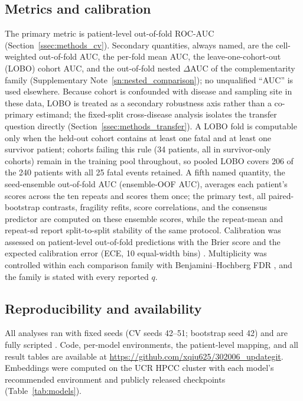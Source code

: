 \documentclass[11pt,a4paper]{article}
\begin{document}
\subsection{Metrics and calibration}
\label{ssec:methods_metrics}

The primary metric is patient-level out-of-fold ROC-AUC
(Section~\ref{ssec:methods_cv}). Secondary quantities, always named, are the
cell-weighted out-of-fold AUC, the per-fold mean AUC, the leave-one-cohort-out
(LOBO) cohort AUC, and the out-of-fold nested $\Delta$AUC of the
complementarity family (Supplementary Note~\ref{sn:nested_comparison}); no
unqualified ``AUC'' is used elsewhere. Because cohort is
confounded with disease and sampling site in these data, LOBO is treated as a
secondary robustness axis rather than a co-primary estimand; the fixed-split
cross-disease analysis isolates the transfer question directly
(Section~\ref{ssec:methods_transfer}). A LOBO fold is computable only when the
held-out cohort contains at least one fatal and at least one survivor patient;
cohorts failing this rule (34 patients, all in survivor-only cohorts) remain
in the training pool throughout, so pooled LOBO covers 206 of the 240 patients
with all 25 fatal events retained. A fifth named quantity, the
seed-ensemble out-of-fold AUC (ensemble-OOF AUC), averages each patient's
scores across the ten repeats and scores them once; the primary test, all
paired-bootstrap contrasts, fragility refits, score correlations, and the
consensus predictor are computed on these ensemble scores, while the
repeat-mean and repeat-sd report split-to-split stability of the same
protocol.
Calibration was
assessed on patient-level out-of-fold predictions with the Brier score \citep{brier1950verification} and the
expected calibration error (ECE, 10 equal-width bins)
\citep{guo2017calibration, vancalster2019calibration}. Multiplicity was
controlled within each comparison family with Benjamini--Hochberg FDR
\citep{benjamini1995controlling}, and the
family is stated with every reported $q$.

\subsection{Reproducibility and availability}
\label{ssec:methods_repro}

All analyses ran with fixed seeds (CV seeds 42--51; bootstrap seed 42) and are
fully scripted \citep{fahsbender2025czi}. Code, per-model environments, the patient-level mapping, and
all result tables are available at \url{https://github.com/xqiu625/302006_updategit}. Embeddings were computed
on the UCR HPCC cluster with each model's recommended environment and publicly
released checkpoints (Table~\ref{tab:models}).
\end{document}
